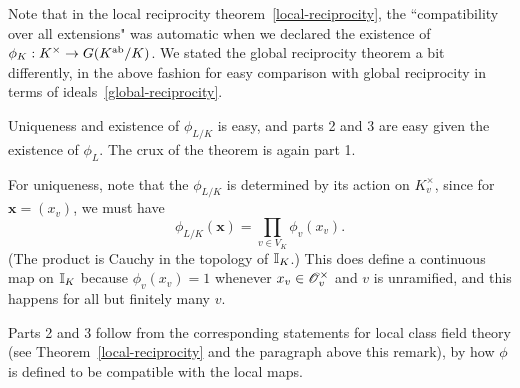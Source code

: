 Note that in the local reciprocity theorem~\ref{local-reciprocity}, the ``compatibility over all extensions" was automatic when we declared the existence of $\phi_K:K^{\times}\to G(K^{\text{ab}}/K)$. We stated the global reciprocity theorem a bit differently, in the above fashion for easy comparison with global reciprocity in terms of ideals~\ref{global-reciprocity}.%
\begin{rem}
Uniqueness and existence of $\phi_{L/K}$ is easy, and parts 2 and 3 are easy given the existence of $\phi_L$. The crux of the theorem is again part 1.

For uniqueness, note that the $\phi_{L/K}$ is determined by its action on $K_v^{\times}$, since for $\mathbf x=(x_v)$, we must have
\[
\phi_{L/K}(\mathbf x)=\prod_{v\in V_K} \phi_v(x_v).
\]
(The product is Cauchy in the topology of $\mathbb{I}_K$.) This does define a continuous map on $\mathbb{I}_K$ because $\phi_v(x_v)=1$ whenever $x_v\in \mathscr{O}_v^{\times}$ and $v$ is unramified, and this happens for all but finitely many $v$. %

Parts 2 and 3 follow from the corresponding statements for local class field theory (see Theorem~\ref{local-reciprocity} and the paragraph above this remark), by how $\phi$ is defined to be compatible with the local maps.
\end{rem}

